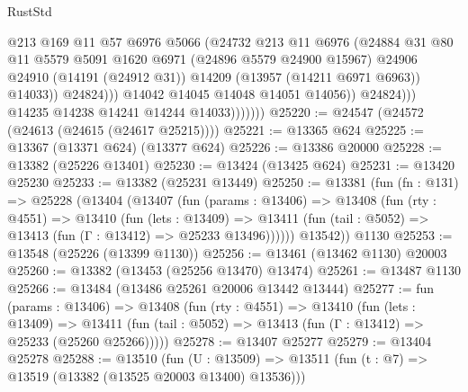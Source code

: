 \begin{lexlean}{RustStd}
\begin{coremodule}
                                  @213
                                  @169
                                  @11
                                  @57
                                  @6976
                                  @5066
                                  (@24732
                                    @213
                                    @11
                                    @6976
                                    (@24884
                                      @31
                                      @80
                                      @11
                                      @5579
                                      @5091
                                      @1620
                                      @6971
                                      (@24896 @5579 @24900 @15967)
                                      @24906
                                      @24910
                                      (@14191 (@24912 @31))
                                      @14209
                                      (@13957 (@14211 @6971 @6963))
                                      @14033))
                                  @24824)))
                            @14042
                            @14045
                            @14048
                            @14051
                            @14056))
                        @24824)))
                  @14235
                  @14238
                  @14241
                  @14244
                  @14033)))))))
@25220 := @24547 (@24572 (@24613 (@24615 (@24617 @25215))))
@25221 := @13365 @624
@25225 := @13367 (@13371 @624) (@13377 @624)
@25226 := @13386 @20000
@25228 := @13382 (@25226 @13401)
@25230 := @13424 (@13425 @624)
@25231 := @13420 @25230
@25233 := @13382 (@25231 @13449)
@25250 := @13381
    (fun (fn : @131) =>
    @25228
      (@13404
        (@13407
          (fun (params : @13406) =>
          @13408
            (fun (rty : @4551) =>
            @13410
              (fun (lets : @13409) =>
              @13411 (fun (tail : @5052) => @13413 (fun (Γ : @13412) => @25233 @13496))))))
        @13542))
    @1130
@25253 := @13548 (@25226 (@13399 @1130))
@25256 := @13461 (@13462 @1130) @20003
@25260 := @13382 (@13453 (@25256 @13470) @13474)
@25261 := @13487 @1130
@25266 := @13484 (@13486 @25261 @20006 @13442 @13444)
@25277 := fun (params : @13406) =>
  @13408
    (fun (rty : @4551) =>
    @13410
      (fun (lets : @13409) =>
      @13411 (fun (tail : @5052) => @13413 (fun (Γ : @13412) => @25233 (@25260 @25266)))))
@25278 := @13407 @25277
@25279 := @13404 @25278
@25288 := @13510
    (fun (U : @13509) => @13511 (fun (t : @7) => @13519 (@13382 (@13525 @20003 @13400) @13536)))

\end{coremodule}
\end{lexlean}
